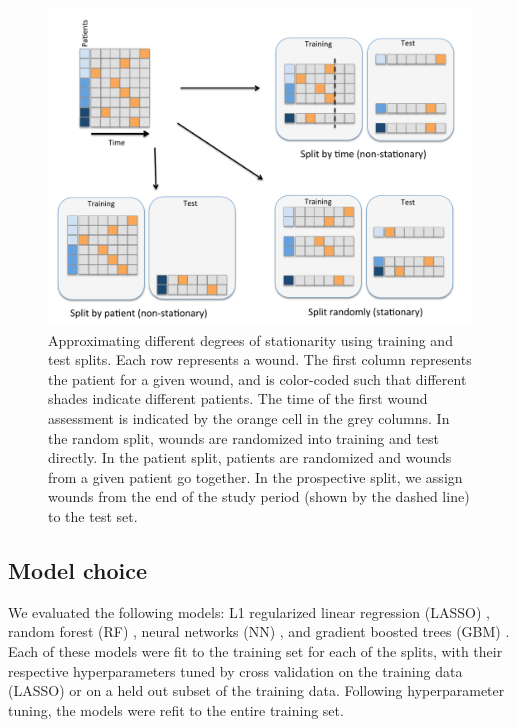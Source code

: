 \begin{figure}
  \begin{center}
    \includegraphics[width=0.9\linewidth]{ch5-figures/train_test_splits.pdf}
  \end{center}
  \caption[Approximating different degrees of stationarity using
    training and test splits] {Approximating different degrees of
    stationarity using training and test splits. Each row represents a
    wound.  The first column represents the patient for a given wound,
    and is color-coded such that different shades indicate different
    patients.  The time of the first wound assessment is indicated by
    the orange cell in the grey columns. In the random split, wounds
    are randomized into training and test directly. In the patient
    split, patients are randomized and wounds from a given patient go
    together. In the prospective split, we assign wounds from the end
    of the study period (shown by the dashed line) to the test set.}
  \label{fig:short}
\end{figure}


\subsection{Model choice}	
We evaluated the following models: L1 regularized linear regression
(LASSO) \cite{Lasso}, random forest (RF) \cite{Breiman2001,Liaw2002},
neural networks (NN) \cite{Goodfellow2013,Pylearn}, and gradient
boosted trees (GBM) \cite{Friedman2001,Ridgeway2007}. Each of these
models were fit to the training set for each of the splits, with their
respective hyperparameters tuned by cross validation on the training
data (LASSO) or on a held out subset of the training data.  Following
hyperparameter tuning, the models were refit to the entire training
set.

